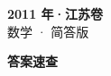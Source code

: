 \documentclass[zihao=-4, a4paper]{ctexart}
\begin{document}
\begin{center}
  {\Large\bfseries 2011 年·江苏卷}\\[4pt]
  {\large 数学 · 简答版}
\end{center}
\medskip
{}

\clearpage
{}
\begin{center}{\Large\bfseries 答案速查}\end{center}
\medskip

\end{document}
